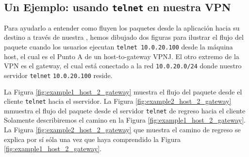 \subsection{Un Ejemplo: usando {\tt telnet} en nuestra VPN} 

Para ayudarlo a entender como fluyen los paquetes desde la aplicación hacia su destino a través de nuestra \miniVPN, hemos dibujado dos figuras para ilustrar el flujo del paquete cuando los usuarios ejecutan  {\tt telnet 10.0.20.100} desde la máquina host, el cual es el Punto A de un host-to-gateway VPNJ. El otro extremo de la VPN es el gateway, el cual está conectado a la red {\tt 10.0.20.0/24}  donde nuestro servidor  {\tt telnet} {\tt 10.0.20.100} reside.

La Figura \ref{fig:example1_host_2_gateway} muestra el flujo del paquete desde el cliente {\tt telnet} hacia el sservidor.
La Figura \ref{fig:example2_host_2_gateway}  mmuestra el flujo del paquete desde el servidor {\tt telnet} de regreso hacia el cliente
Solamente describiremos el camino en la Figura \ref{fig:example1_host_2_gateway}. La Figura \ref{fig:example2_host_2_gateway} que muestra el camino de regreso se explica por sí sóla una vez que haya comprendido la Figura \ref{fig:example1_host_2_gateway}.  

